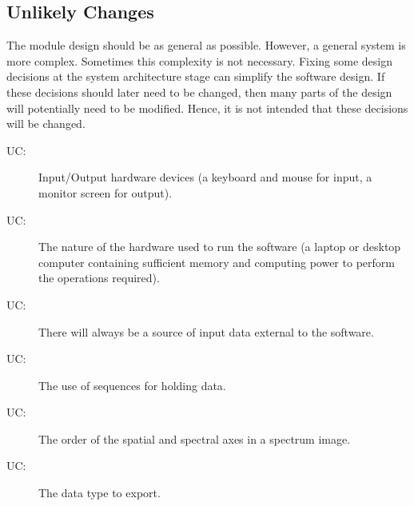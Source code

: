 \documentclass[12pt, titlepage]{article}
\newcounter{ucnum}
\newcommand{\uctheucnum}{UC\theucnum}
\begin{document}
\subsection{Unlikely Changes} \label{SecUchange}

The module design should be as general as possible. However, a general system is
more complex. Sometimes this complexity is not necessary. Fixing some design
decisions at the system architecture stage can simplify the software design. If
these decisions should later need to be changed, then many parts of the design
will potentially need to be modified. Hence, it is not intended that these
decisions will be changed.

\begin{description}
	\item[ \uctheucnum \label{ucIO}:] Input/Output hardware
devices (a keyboard and mouse for input, a monitor screen for output).
	\item[ \uctheucnum \label{ucHardware}:] The nature of the
hardware used to run the software (a laptop or desktop computer containing
sufficient memory and computing power to perform the operations required).
	\item[ \uctheucnum \label{ucInput}:] There will always be
	  a source of input data external to the software.
	\item[ \uctheucnum \label{ucSeq}:]  The use of sequences
    for holding data. 


	\item[ \uctheucnum \label{uc3DSIAxisOrder}:] The order of
the spatial and spectral axes in a spectrum image.
	\item[ \uctheucnum \label{ucExDataType}:] The data type
to export.
\end{description}
\end{document}
